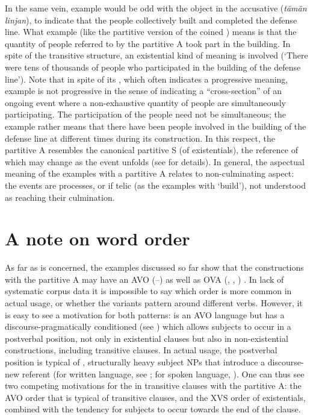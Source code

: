 \documentclass[output=paper]{LSP/langsci}
\begin{document}
In the same vein, example  would be odd with the object in the accusative (\textit{tämän linjan}), to indicate that the people collectively built and completed the defense line. What example  (like the partitive version of the coined ) means is that the quantity of people referred to by the partitive A took part in the building. In spite of the transitive structure, an existential kind of meaning is involved (‘There were tens of thousands of people who participated in the building of the defense line’). Note that in spite of its , which often indicates a progressive meaning, example  is not progressive in the sense of indicating a “cross-section” of an ongoing event where a non-exhaustive quantity of people are simultaneously participating. The participation of the people need not be simultaneous; the example rather means that there have been people involved in the building of the defense line at different times during its construction. In this respect, the partitive A resembles the canonical partitive S (of existentials), the reference of which may change as the event unfolds (see \citealt{Huumo2003Incremental} for details). In general, the aspectual meaning of the examples with a partitive A relates to non-culminating aspect: the events are  processes, or if telic (as the examples with ‘build’), not understood as reaching their culmination. 

\section{A note on word order }
\label{15-hu-sec:4}

As far as  is concerned, the examples discussed so far show that the constructions with the partitive A may have an AVO (–) as well as OVA (, , ) . In lack of systematic corpus data it is impossible to say which order is more common in actual usage, or whether the  variants pattern around different verbs. However, it is easy to see a motivation for both patterns:  is an AVO language but has a discourse-pragmatically conditioned  (see \citealt[35–62]{Vilkuna1989Free}) which allows  subjects to occur in a postverbal position, not only in existential clauses but also in non-existential constructions, including transitive clauses. In actual usage, the postverbal position is typical of , structurally heavy subject NPs that introduce a discourse-new referent (for written language, see \citealt{Huumo1995Position}; for spoken language, \citealt[75–81]{Helasvuo2001Syntax}). One can thus see two competing motivations for the  in transitive clauses with the partitive A: the AVO order that is typical of  transitive clauses, and the XVS order of existentials, combined with the tendency for  subjects to occur towards the end of the clause. 
\end{document}
